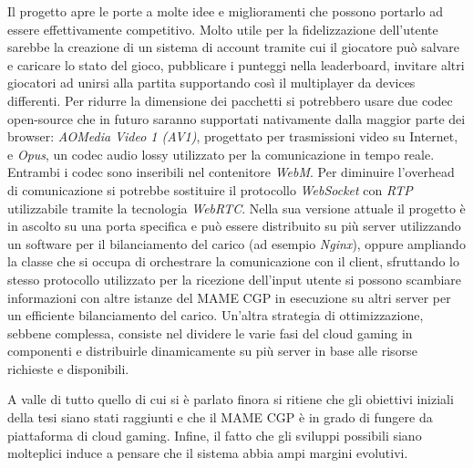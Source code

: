 Il progetto apre le porte a molte idee e miglioramenti che possono portarlo ad essere effettivamente competitivo. Molto utile per la fidelizzazione dell'utente sarebbe la creazione di un sistema di account tramite cui il giocatore può salvare e caricare lo stato del gioco, pubblicare i punteggi nella leaderboard, invitare altri giocatori ad unirsi alla partita supportando così il multiplayer da devices differenti. Per ridurre la dimensione dei pacchetti si potrebbero usare due codec open-source che in futuro saranno supportati nativamente dalla maggior parte dei browser: \textit{AOMedia Video 1 (AV1)}, progettato per trasmissioni video su Internet, e \textit{Opus}, un codec audio lossy utilizzato per la comunicazione in tempo reale. Entrambi i codec sono inseribili nel contenitore \textit{WebM}. Per diminuire l'overhead di comunicazione si potrebbe sostituire il protocollo \textit{WebSocket} con \textit{RTP} utilizzabile tramite la tecnologia \textit{WebRTC}. Nella sua versione attuale il progetto è in ascolto su una porta specifica e può essere distribuito su più server utilizzando un software per il bilanciamento del carico (ad esempio \textit{Nginx}), oppure ampliando la classe che si occupa di orchestrare la comunicazione con il client, sfruttando lo stesso protocollo utilizzato per la ricezione dell'input utente si possono scambiare informazioni con altre istanze del MAME CGP in esecuzione su altri server per un efficiente bilanciamento del carico. Un'altra strategia di ottimizzazione, sebbene complessa, consiste nel dividere le varie fasi del cloud gaming in componenti e distribuirle dinamicamente su più server in base alle risorse richieste e disponibili.

A valle di tutto quello di cui si è parlato finora si ritiene che gli obiettivi iniziali della tesi siano stati raggiunti e che il MAME CGP è in grado di fungere da piattaforma di cloud gaming. Infine, il fatto che gli sviluppi possibili siano molteplici induce a pensare che il sistema abbia ampi margini evolutivi.